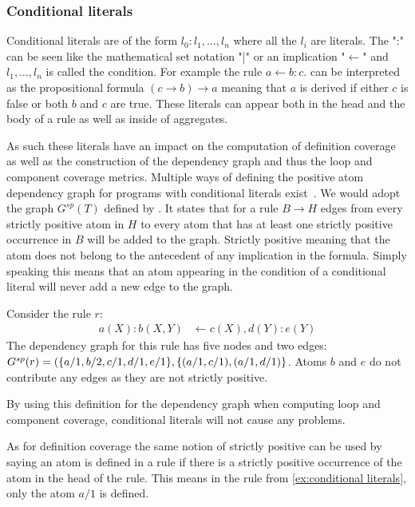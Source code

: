 \subsubsection{Conditional literals}
\label{subsubsec:Coverage for further program classes/Language constructs/Conditional literals}
Conditional literals are of the form \(l_0 : l_1, \ldots, l_n\) where all the \(l_i\) are literals. The ":" can be seen like the mathematical set notation "|" or an implication "$\leftarrow$" and \(l_1, \ldots, l_n\) is called the condition. For example the rule \(a \leftarrow b : c.\) can be interpreted as the propositional formula \((c \rightarrow b) \rightarrow a\) meaning that $a$ is derived if either $c$ is false or both $b$ and $c$ are true. These literals can appear both in the head and the body of a rule as well as inside of aggregates.

As such these literals have an impact on the computation of definition coverage as well as the construction of the dependency graph and thus the loop and component coverage metrics. Multiple ways of defining the positive atom dependency graph for programs with conditional literals exist~\cite{FLL06, FL22}. We would adopt the graph \(G^{sp}(T)\) defined by \textcite{FL22}. It states that for a rule \(B \rightarrow H\) edges from every strictly positive atom in $H$ to every atom that has at least one strictly positive occurrence in $B$ will be added to the graph. Strictly positive meaning that the atom does not belong to the antecedent of any implication in the formula. Simply speaking this means that an atom appearing in the condition of a conditional literal will never add a new edge to the graph.

\begin{example}
\label{ex:conditional literals}
    Consider the rule $r$:
    \begin{align*}
        a(X) : b(X, Y) &\leftarrow c(X), d(Y) : e(Y)
    \end{align*}
    The dependency graph for this rule has five nodes and two edges: \(G^{sp}(r) = (\{a/1, b/2, \\ c/1, d/1, e/1\}, \{(a/1, c/1), (a/1, d/1)\}\). Atoms $b$ and $e$ do not contribute any edges as they are not strictly positive.
\end{example}

By using this definition for the dependency graph when computing loop and component coverage, conditional literals will not cause any problems.

As for definition coverage the same notion of strictly positive can be used by saying an atom is defined in a rule if there is a strictly positive occurrence of the atom in the head of the rule. This means in the rule from \cref{ex:conditional literals}, only the atom $a/1$ is defined.

